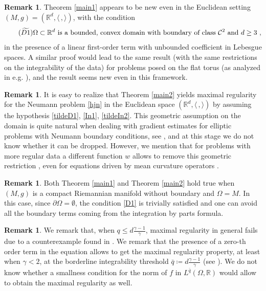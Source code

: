 \documentclass[10pt, a4paper, reqno, oneside]{amsart}
\theoremstyle{plain}
\theoremstyle{definition}
\newtheorem{rem}[theo]{Remark}
\theoremstyle{plain}
\theoremstyle{definition}
\theoremstyle{plain}
\renewcommand{\=}{:=}
\begin{document}
\begin{rem} 
Theorem \ref{main1} appears to be new even in the Euclidean setting $(M,g)=(\mathbb{R}^d,\langle\,,\rangle)$, with the condition
\begin{equation} \label{tildeD1} \tag{$\widetilde{D1}$}
\text{$\Omega \subset \mathbb{R}^d$ is a bounded, convex domain with boundary of class $\mathcal{C}^2$ and $d \geq 3$} \,\, ,
\end{equation}
in the presence of a linear first-order term with unbounded coefficient in Lebesgue spaces. A similar proof would lead to the same result (with the same restrictions on the integrability of the data) for problems posed on the flat torus (as analyzed in e.g. \cite{PV}), and the result seems new even in this framework.
\end{rem}

\begin{rem} \label{remEucl}
It is easy to realize that Theorem \ref{main2} yields maximal regularity for the Neumann problem \eqref{hjn} in the Euclidean space $(\mathbb{R}^d,\langle\,,\rangle)$ by assuming the hypothesis \eqref{tildeD1}, \eqref{In1}, \eqref{tildeIn2}. This geometric assumption on the domain is quite natural when dealing with gradient estimates for elliptic problems with Neumann boundary conditions, see \cite{Lio80,CirantJMPA,PorrCCM,PorLeo}, and at this stage we do not know whether it can be dropped. However, we mention that for problems with more regular data a different function $w$ allows to remove this geometric restriction \cite[Proposition 7.1]{PorLeo}, even for equations driven by mean curvature operators \cite[Lemma 2.3]{PorrCCM}.
\end{rem}

\begin{rem}\label{senzabdr}
Both Theorem \ref{main1} and Theorem \ref{main2} hold true when $(M,g)$ is a compact Riemannian manifold without boundary and $\Omega= M$. In this case, since $\partial \Omega = \emptyset$, the condition \eqref{D1} is trivially satisfied and one can avoid all the boundary terms coming from the integration by parts formula.
\end{rem}

\begin{rem}
We remark that, when $q\leq d\tfrac{\gamma-1}{\gamma}$, maximal regularity in general fails due to a counterexample found in \cite[Remark 1]{CGell}. We remark that the presence of a zero-th order term in the equation allows to get the maximal regularity property, at least when $\gamma<2$, at the borderline integrability threshold $\bar{q} \coloneqq d\frac{\gamma-1}{\gamma}$ (see \cite{CGpar}). We do not know whether a smallness condition for the norm of $f$ in $L^{\bar{q}}(\Omega,\mathbb{R})$ would allow to obtain the maximal regularity as well.
\end{rem}
\end{document}
